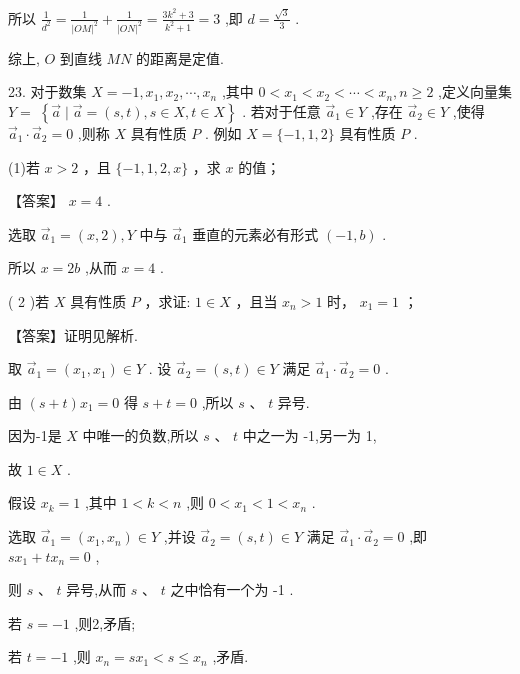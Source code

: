 \documentclass[10pt]{article}
\begin{document}
所以 \(\frac{1}{{d}^{2}} = \frac{1}{{\left| OM\right| }^{2}} + \frac{1}{{\left| ON\right| }^{2}} = \frac{3{k}^{2} + 3}{{k}^{2} + 1} = 3\) ,即 \(d = \frac{\sqrt{3}}{3}\) .

综上, \(O\) 到直线 \({MN}\) 的距离是定值.

23. 对于数集 \(X =  - 1,{x}_{1},{x}_{2},\cdots ,{x}_{n}\) ,其中 \(0 < {x}_{1} < {x}_{2} < \cdots  < {x}_{n},n \geq  2\) ,定义向量集 \(Y = \; \left\{  {\overrightarrow{a} \mid  \overrightarrow{a} = \left( {s,t}\right) ,s \in  X,t \in  X}\right\}\) . 若对于任意 \({\overrightarrow{a}}_{1} \in  Y\) ,存在 \({\overrightarrow{a}}_{2} \in  Y\) ,使得 \({\overrightarrow{a}}_{1} \cdot  {\overrightarrow{a}}_{2} = 0\) ,则称 \(X\) 具有性质 \(P\) . 例如 \(X = \{  - 1,1,2\}\) 具有性质 \(P\) .

(1)若 \(x > 2\) ，且 \(\{  - 1,1,2,x\}\) ，求 \(x\) 的值；

【答案】 \(x = 4\) .

选取 \({\overrightarrow{a}}_{1} = \left( {x,2}\right) ,Y\) 中与 \({\overrightarrow{a}}_{1}\) 垂直的元素必有形式 \(\left( {-1,b}\right)\) .

所以 \(x = {2b}\) ,从而 \(x = 4\) .

( 2 )若 \(X\) 具有性质 \(P\) ，求证: \(1 \in  X\) ，且当 \({x}_{n} > 1\) 时， \({x}_{1} = 1\) ；

【答案】证明见解析.

取 \({\overrightarrow{a}}_{1} = \left( {{x}_{1},{x}_{1}}\right)  \in  Y\) . 设 \({\overrightarrow{a}}_{2} = \left( {s,t}\right)  \in  Y\) 满足 \({\overrightarrow{a}}_{1} \cdot  {\overrightarrow{a}}_{2} = 0\) .

由 \(\left( {s + t}\right) {x}_{1} = 0\) 得 \(s + t = 0\) ,所以 \(s\text{ 、 }t\) 异号.

因为-1是 \(X\) 中唯一的负数,所以 \(s\text{ 、 }t\) 中之一为 -1,另一为 1,

故 \(1 \in  X\) .

假设 \({x}_{k} = 1\) ,其中 \(1 < k < n\) ,则 \(0 < {x}_{1} < 1 < {x}_{n}\) .

选取 \({\overrightarrow{a}}_{1} = \left( {{x}_{1},{x}_{n}}\right)  \in  Y\) ,并设 \({\overrightarrow{a}}_{2} = \left( {s,t}\right)  \in  Y\) 满足 \({\overrightarrow{a}}_{1} \cdot  {\overrightarrow{a}}_{2} = 0\) ,即 \(s{x}_{1} + t{x}_{n} = 0\) ,

则 \(s\text{ 、 }t\) 异号,从而 \(s\text{ 、 }t\) 之中恰有一个为 -1 .

若 \(s =  - 1\) ,则2,矛盾;

若 \(t =  - 1\) ,则 \({x}_{n} = s{x}_{1} < s \leq  {x}_{n}\) ,矛盾.
\end{document}
